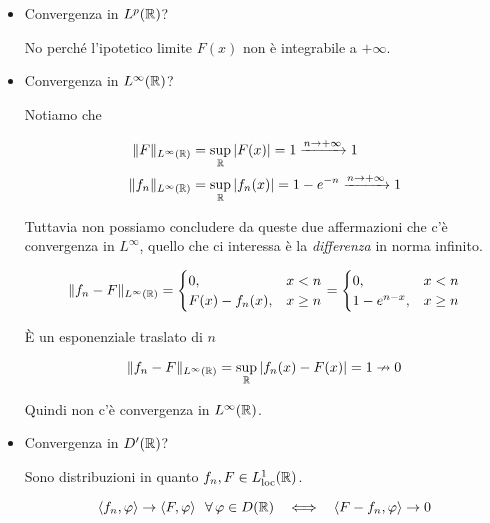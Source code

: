 \begin{itemize}
\item Convergenza in $L^{p}(\mathbb{R})$?

No perché l'ipotetico limite $F(x)$ non è integrabile a $ + \infty $.
\item Convergenza in $L^{\infty}(\mathbb{R})$?

Notiamo che

\begin{equation*}
\begin{aligned}
\Vert F\Vert_{L^{\infty}(\mathbb{R})} & = \sup_{\mathbb{R}}| F(x)| = 1\xrightarrow{n\rightarrow + \infty} 1\\
\Vert f_{n}\Vert_{L^{\infty}(\mathbb{R})} & = \sup_{\mathbb{R}}| f_{n}(x)| = 1 - e^{- n}\xrightarrow{n\rightarrow + \infty} 1
\end{aligned}
\end{equation*}

Tuttavia non possiamo concludere da queste due affermazioni che c'è convergenza in $L^{\infty}$, quello che ci interessa è la \textit{differenza} in norma infinito.

\begin{equation*}
\Vert f_{n} - F\Vert_{L^{\infty}(\mathbb{R})} =
\begin{cases}
0, & x < n\\
F(x) - f_{n}(x), & x \geq n
\end{cases} =
\begin{cases}
0, & x < n\\
1 - e^{n - x}, & x \geq n
\end{cases}
\end{equation*}

È un esponenziale traslato di $n$

\begin{equation*}
\Vert f_{n} - F\Vert_{L^{\infty}(\mathbb{R})} = \sup_{\mathbb{R}}| f_{n}(x) - F(x)| = 1\nrightarrow 0
\end{equation*}

Quindi non c'è convergenza in $L^{\infty}(\mathbb{R})$.
\item Convergenza in $D'(\mathbb{R})$?

Sono distribuzioni in quanto $f_{n}, F\in L^{1}_{\operatorname{loc}}(\mathbb{R})$.

\begin{equation*}
\langle f_{n}, \varphi \rangle \rightarrow \langle F, \varphi \rangle \ \ \forall \varphi \in D(\RR) \ \ \iff \ \ \langle F - f_{n}, \varphi \rangle \rightarrow 0
\end{equation*}


\end{itemize}
